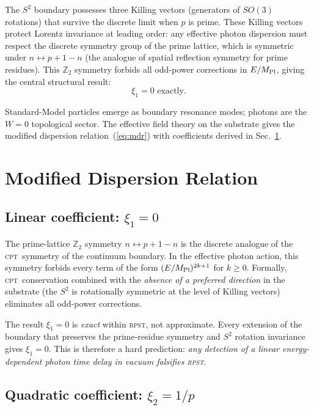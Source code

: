 \documentclass[aps,prd,twocolumn,showpacs,preprintnumbers]{revtex4-2}
\newcommand{\rpst}{\textsc{rpst}}
\newcommand{\Mpl}{M_{\rm Pl}}
\newcommand{\CPT}{\textsc{cpt}}
\begin{document}
The $S^2$ boundary possesses three Killing vectors (generators of $SO(3)$
rotations) that survive the discrete limit when $p$ is prime.  These Killing
vectors protect Lorentz invariance at leading order: any effective photon
dispersion must respect the discrete symmetry group of the prime lattice, which
is symmetric under $n \leftrightarrow p+1-n$ (the analogue of spatial
reflection symmetry for prime residues).  This $\mathbb{Z}_2$ symmetry
forbids all odd-power corrections in $E/\Mpl$, giving the central structural
result:
\begin{equation}
  \boxed{\xi_1 = 0 \text{ exactly}.}
\label{eq:xi1}
\end{equation}

Standard-Model particles emerge as boundary resonance modes; photons are the
$W = 0$ topological sector.  The effective field theory on the substrate gives
the modified dispersion relation~(\ref{eq:mdr}) with coefficients derived in
Sec.~\ref{sec:mdr}.

\section{Modified Dispersion Relation}
\label{sec:mdr}

\subsection{Linear coefficient: \texorpdfstring{$\xi_1 = 0$}{xi1 = 0}}

The prime-lattice $\mathbb{Z}_2$ symmetry $n \leftrightarrow p+1-n$ is the
discrete analogue of the \CPT\ symmetry of the continuum boundary.  In the
effective photon action, this symmetry forbids every term of the form
$(E/\Mpl)^{2k+1}$ for $k \geq 0$.  Formally, \CPT\ conservation combined
with the \textit{absence of a preferred direction} in the substrate (the
$S^2$ is rotationally symmetric at the level of Killing vectors) eliminates
all odd-power corrections.

The result $\xi_1 = 0$ is \textit{exact} within \rpst, not approximate.
Every extension of the boundary that preserves the prime-residue symmetry and
$S^2$ rotation invariance gives $\xi_1 = 0$.  This is therefore a hard
prediction: \textit{any detection of a linear energy-dependent photon time
delay in vacuum falsifies \rpst}.

\subsection{Quadratic coefficient: \texorpdfstring{$\xi_2 = 1/p$}{xi2 = 1/p}}
\end{document}
